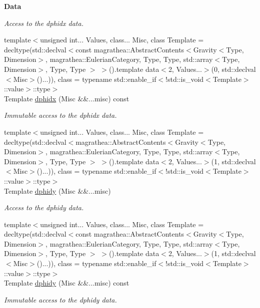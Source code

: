 \begin{Indent}{\bf Data}
\begin{DoxyCompactItemize}
\begin{DoxyCompactList}\small\item\em Access to the dphidx data. \end{DoxyCompactList}\item 
{\footnotesize template$<$unsigned int... Values, class... Misc, class Template  = decltype(std\-::declval$<$const magrathea\-::\-Abstract\-Contents$<$\-Gravity$<$\-Type, Dimension$>$, magrathea\-::\-Eulerian\-Category, Type, Type, std\-::array$<$\-Type, Dimension$>$, Type, Type $>$ $>$().\-template data$<$2, Values...$>$(0, std\-::declval$<$\-Misc$>$()...)), class  = typename std\-::enable\-\_\-if$<$!std\-::is\-\_\-void$<$\-Template$>$\-::value$>$\-::type$>$ }\\Template \hyperlink{exceptionGravity_aa2beccc3bed46958484f285af231d463}{dphidx} (Misc \&\&...misc) const 
\begin{DoxyCompactList}\small\item\em Immutable access to the dphidx data. \end{DoxyCompactList}\item 
{\footnotesize template$<$unsigned int... Values, class... Misc, class Template  = decltype(std\-::declval$<$magrathea\-::\-Abstract\-Contents$<$\-Gravity$<$\-Type, Dimension$>$, magrathea\-::\-Eulerian\-Category, Type, Type, std\-::array$<$\-Type, Dimension$>$, Type, Type $>$ $>$().\-template data$<$2, Values...$>$(1, std\-::declval$<$\-Misc$>$()...)), class  = typename std\-::enable\-\_\-if$<$!std\-::is\-\_\-void$<$\-Template$>$\-::value$>$\-::type$>$ }\\Template \hyperlink{exceptionGravity_a8cf27f2813e85ea1eebe12bcd6ad7195}{dphidy} (Misc \&\&...misc)
\begin{DoxyCompactList}\small\item\em Access to the dphidy data. \end{DoxyCompactList}\item 
{\footnotesize template$<$unsigned int... Values, class... Misc, class Template  = decltype(std\-::declval$<$const magrathea\-::\-Abstract\-Contents$<$\-Gravity$<$\-Type, Dimension$>$, magrathea\-::\-Eulerian\-Category, Type, Type, std\-::array$<$\-Type, Dimension$>$, Type, Type $>$ $>$().\-template data$<$2, Values...$>$(1, std\-::declval$<$\-Misc$>$()...)), class  = typename std\-::enable\-\_\-if$<$!std\-::is\-\_\-void$<$\-Template$>$\-::value$>$\-::type$>$ }\\Template \hyperlink{exceptionGravity_adfd468d2bc0e2552baa7ff8a5b193593}{dphidy} (Misc \&\&...misc) const 
\begin{DoxyCompactList}\small\item\em Immutable access to the dphidy data. \end{DoxyCompactList}\item 

\end{DoxyCompactItemize}
\end{Indent}
